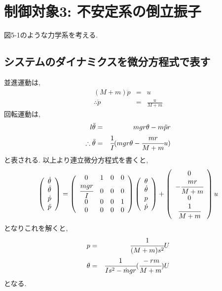 \documentclass[12pt]{jsarticle}   	%
\begin{document}
\section{制御対象3: 不安定系の倒立振子}
\noindent
図5-1のような力学系を考える.
\subsection{システムのダイナミクスを微分方程式で表す}
\noindent
並進運動は, 
\begin{eqnarray}
( M + m ) \ddot p &=& u\\ 
\therefore \ddot p &=& \frac{u}{M+m}
\end{eqnarray}
回転運動は, 
\begin{eqnarray}
l\ddot\theta &=& mgr\theta - m\ddot pr\\
\therefore \ddot \theta &=& \cfrac{1}{I}(mgr\theta-\cfrac{mr}{M+m}u)
\end{eqnarray}
と表される.
以上より連立微分方程式を書くと,
\begin{eqnarray}
\left(\begin{array}{c}
\dot \theta\\
\ddot \theta\\
\dot p\\
\ddot p
\end{array}
\right)
=
\left(
\begin{array}{cccc}
0 & 1 & 0 & 0\\
\cfrac{mgr}{I} & 0 & 0 & 0\\
0 & 0 & 0 & 1\\
0 & 0 & 0 & 0\\
\end{array}
\right)
\left(
\begin{array}{c}
\theta\\
\dot \theta\\
p\\
\dot p
\end{array}
\right)+\left(
\begin{array}{c}
0\\
-\cfrac{mr}{M+m}\\
0\\
\cfrac{1}{M+m}
\end{array}
\right)
u
\end{eqnarray}
となりこれを解くと, 
 \begin{eqnarray}
p &=& \cfrac{1}{(M+m)s^2}U \\
\theta &=& \cfrac{1}{Is^2-\dot mgr}(\cfrac{-rm}{M+m})U
\end{eqnarray}
となる.
\end{document}

